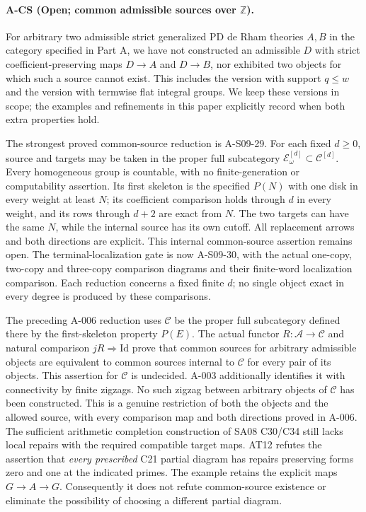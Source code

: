 \paragraph{A-CS (Open; common admissible sources over $\mathbb Z$).}
For arbitrary two admissible strict generalized PD de Rham theories
$A,B$ in the category specified in Part A, we have not constructed
an admissible $D$ with strict coefficient-preserving maps
$D\to A$ and $D\to B$, nor exhibited two objects for which such
a source cannot exist.  This includes the version with support
$q\leq w$ and the version with termwise flat integral groups.
We keep these versions in scope; the examples and refinements in
this paper explicitly record when both extra properties hold.

The strongest proved common-source reduction is A-S09-29.
For each fixed $d\geq0$, source and targets may be taken in the
proper full subcategory $\mathcal E^{[d]}_\omega\subset\mathcal C^{[d]}$.
Every homogeneous group is countable, with no finite-generation
or computability assertion.
Its first skeleton is the specified $P(N)$ with one disk in every
weight at least $N$; its coefficient comparison holds through $d$
in every weight, and its rows through $d+2$ are exact from $N$.
The two targets can have the same $N$, while the internal source
has its own cutoff. All replacement arrows and both directions
are explicit. This internal common-source assertion remains open.
The terminal-localization gate is now A-S09-30, with the actual
one-copy, two-copy and three-copy comparison diagrams and their
finite-word localization comparison.
Each reduction concerns a fixed finite $d$; no single object exact
in every degree is produced by these comparisons.

The preceding A-006 reduction uses $\mathcal C$
be the proper full subcategory defined there by the first-skeleton
property $P(E)$.  The actual functor $R:\mathcal A\to\mathcal C$
and natural comparison $jR\Rightarrow\mathrm{Id}$ prove that
common sources for arbitrary admissible objects are equivalent
to common sources internal to $\mathcal C$ for every pair of
its objects.  This assertion for $\mathcal C$ is undecided.
A-003 additionally identifies it with connectivity by finite
zigzags.  No such zigzag between arbitrary objects of
$\mathcal C$ has been constructed.  This is a genuine restriction
of both the objects and the allowed source, with every comparison
map and both directions proved in A-006.
The sufficient arithmetic completion construction of SA08 C30/C34
still lacks local repairs with the required compatible target maps.
AT12 refutes the assertion that \emph{every prescribed} C21 partial
diagram has repairs preserving forms zero and one at the indicated
primes.  The example retains the explicit maps $G\to A\to G$.
Consequently it does not refute common-source existence or eliminate
the possibility of choosing a different partial diagram.

